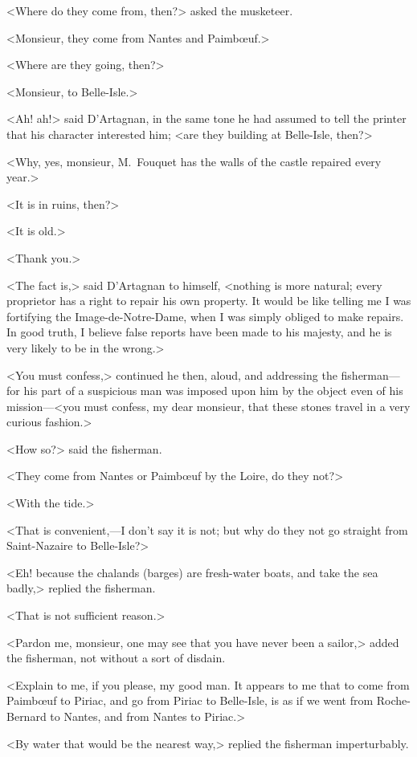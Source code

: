 <Where do they come from, then?> asked the musketeer.

<Monsieur, they come from Nantes and Paimbœuf.>

<Where are they going, then?>

<Monsieur, to Belle-Isle.>

<Ah! ah!> said D'Artagnan, in the same tone he had assumed to tell the printer that his character interested him; <are they building at Belle-Isle, then?>

<Why, yes, monsieur, M.~Fouquet has the walls of the castle repaired every year.>

<It is in ruins, then?>

<It is old.>

<Thank you.>

<The fact is,> said D'Artagnan to himself, <nothing is more natural; every proprietor has a right to repair his own property. It would be like telling me I was fortifying the Image-de-Notre-Dame, when I was simply obliged to make repairs. In good truth, I believe false reports have been made to his majesty, and he is very likely to be in the wrong.>

<You must confess,> continued he then, aloud, and addressing the fisherman—for his part of a suspicious man was imposed upon him by the object even of his mission—<you must confess, my dear monsieur, that these stones travel in a very curious fashion.>

<How so?> said the fisherman.

<They come from Nantes or Paimbœuf by the Loire, do they not?>

<With the tide.>

<That is convenient,—I don't say it is not; but why do they not go straight from Saint-Nazaire to Belle-Isle?>

<Eh! because the chalands (barges) are fresh-water boats, and take the sea badly,> replied the fisherman.

<That is not sufficient reason.>

<Pardon me, monsieur, one may see that you have never been a sailor,> added the fisherman, not without a sort of disdain.

<Explain to me, if you please, my good man. It appears to me that to come from Paimbœuf to Piriac, and go from Piriac to Belle-Isle, is as if we went from Roche-Bernard to Nantes, and from Nantes to Piriac.>

<By water that would be the nearest way,> replied the fisherman imperturbably.

